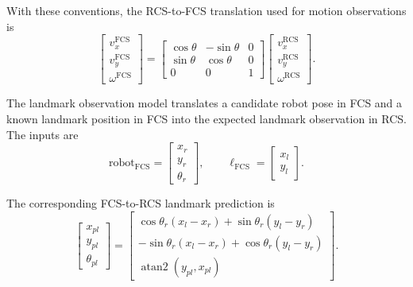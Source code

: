 With these conventions, the RCS-to-FCS translation used for motion observations is
\begin{equation}
    \begin{bmatrix}
        v_x^{\mathrm{FCS}} \\
        v_y^{\mathrm{FCS}} \\
        \omega^{\mathrm{FCS}}
    \end{bmatrix}
    =
    \begin{bmatrix}
        \cos\theta & -\sin\theta & 0 \\
        \sin\theta & \cos\theta & 0 \\
        0 & 0 & 1
    \end{bmatrix}
    \begin{bmatrix}
        v_x^{\mathrm{RCS}} \\
        v_y^{\mathrm{RCS}} \\
        \omega^{\mathrm{RCS}}
    \end{bmatrix}.
    \label{eq:fcs-rcs-motion-transform}
\end{equation}

The landmark observation model translates a candidate robot pose in FCS and a known landmark position in FCS into the expected landmark observation in RCS. The inputs are
\begin{equation}
    \mathrm{robot}_{\mathrm{FCS}}
    =
    \begin{bmatrix}
        x_r \\
        y_r \\
        \theta_r
    \end{bmatrix},
    \qquad
    \ell_{\mathrm{FCS}}
    =
    \begin{bmatrix}
        x_l \\
        y_l
    \end{bmatrix}.
    \label{eq:landmark-inputs-fcs}
\end{equation}

The corresponding FCS-to-RCS landmark prediction is
\begin{equation}
    \begin{bmatrix}
        x_{pl} \\
        y_{pl} \\
        \theta_{pl}
    \end{bmatrix}
    =
    \begin{bmatrix}
        \cos\theta_r (x_l-x_r) + \sin\theta_r (y_l-y_r) \\
        -\sin\theta_r (x_l-x_r) + \cos\theta_r (y_l-y_r) \\
        \operatorname{atan2}(y_{pl},x_{pl})
    \end{bmatrix}.
    \label{eq:fcs-to-rcs}
\end{equation}

